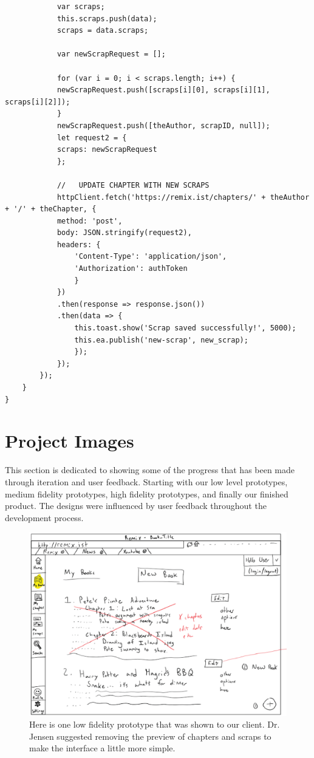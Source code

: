 \documentclass[onecolumn, draftclsnofoot,10pt, compsoc]{IEEEtran}
\begin{document}
\begin{lstlisting}
			var scraps;
			this.scraps.push(data);
			scraps = data.scraps;
			
			var newScrapRequest = [];
			
			for (var i = 0; i < scraps.length; i++) {
			newScrapRequest.push([scraps[i][0], scraps[i][1], scraps[i][2]]);
			}
			newScrapRequest.push([theAuthor, scrapID, null]);
			let request2 = {
			scraps: newScrapRequest
			};
			
			//   UPDATE CHAPTER WITH NEW SCRAPS
			httpClient.fetch('https://remix.ist/chapters/' + theAuthor + '/' + theChapter, {
			method: 'post',
			body: JSON.stringify(request2),
			headers: {
				'Content-Type': 'application/json',
				'Authorization': authToken
				}
			})
			.then(response => response.json())
			.then(data => {
				this.toast.show('Scrap saved successfully!', 5000);
				this.ea.publish('new-scrap', new_scrap);
				});
			});
		});
	}
}
\end{lstlisting}

\newpage
\section{Project Images}

\noindent This section is dedicated to showing some of the progress that has been made through iteration and user feedback. Starting with our low level prototypes, medium fidelity prototypes, high fidelity prototypes, and finally our finished product. The designs were influenced by user feedback throughout the development process.

\begin{figure}[ht!]
	\centering
	\includegraphics[width=12cm]{images/prototype}
	\caption{Here is one low fidelity prototype that was shown to our client. Dr. Jensen suggested 
		removing the preview of chapters and scraps to make the interface a little more simple.}
\end{figure}
\end{document}
